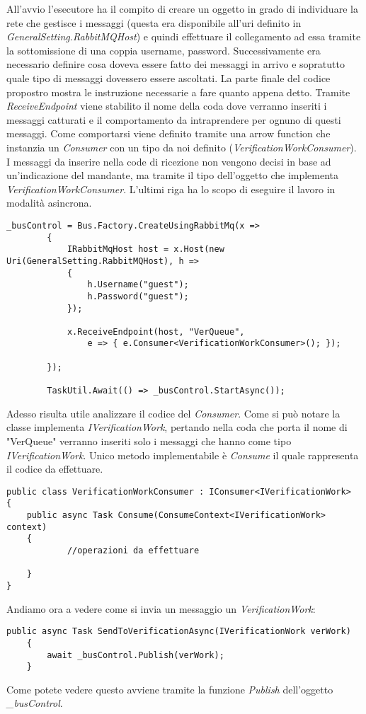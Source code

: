 All'avvio l'esecutore ha il compito di creare un oggetto in grado di individuare la rete che gestisce i messaggi (questa era disponibile all'uri definito in \emph{GeneralSetting.RabbitMQHost}) e quindi effettuare il collegamento ad essa tramite la sottomissione di una coppia username, password.
Successivamente era necessario definire cosa doveva essere fatto dei messaggi in arrivo e sopratutto quale tipo di messaggi dovessero essere ascoltati. La parte finale del codice propostro mostra le instruzione necessarie a fare quanto appena detto. Tramite \emph{ReceiveEndpoint} viene stabilito il nome della coda dove verranno inseriti i messaggi catturati e il comportamento da intraprendere per ognuno di questi messaggi. Come comportarsi viene definito tramite una arrow function che instanzia un \emph{Consumer} con un tipo da noi definito (\emph{VerificationWorkConsumer}). I messaggi da inserire nella code di ricezione non vengono decisi in base ad un'indicazione del mandante, ma tramite il tipo dell'oggetto che implementa \emph{VerificationWorkConsumer}.
L'ultimi riga ha lo scopo di eseguire il lavoro in modalità asincrona.
\begin{lstlisting}[caption={creazione di un collegamento a \emph{RabbitMQ}}]
    _busControl = Bus.Factory.CreateUsingRabbitMq(x =>
        {
            IRabbitMqHost host = x.Host(new Uri(GeneralSetting.RabbitMQHost), h =>
            {
                h.Username("guest");
                h.Password("guest");
            });
            
            x.ReceiveEndpoint(host, "VerQueue",
                e => { e.Consumer<VerificationWorkConsumer>(); });
            
        });

        TaskUtil.Await(() => _busControl.StartAsync());
\end{lstlisting}

Adesso risulta utile analizzare il codice del \emph{Consumer}. Come si può notare la classe implementa \emph{IVerificationWork}, pertando nella coda che porta il nome di "VerQueue" verranno inseriti solo i messaggi che hanno come tipo \emph{IVerificationWork}.
Unico metodo implementabile è \emph{Consume} il quale rappresenta il codice da effettuare.

\begin{lstlisting}[caption={esempio di \emph{Consumer}}]
public class VerificationWorkConsumer : IConsumer<IVerificationWork>
{
    public async Task Consume(ConsumeContext<IVerificationWork> context)
    {
            //operazioni da effettuare

    }
}
\end{lstlisting}

Andiamo ora a vedere come si invia un messaggio un \emph{VerificationWork}:
\begin{lstlisting}[caption={codice invio di un messaggio}]
    public async Task SendToVerificationAsync(IVerificationWork verWork)
    {
        await _busControl.Publish(verWork);
    }
\end{lstlisting}

Come potete vedere questo avviene tramite la funzione \emph{Publish} dell'oggetto \emph{\_busControl}.